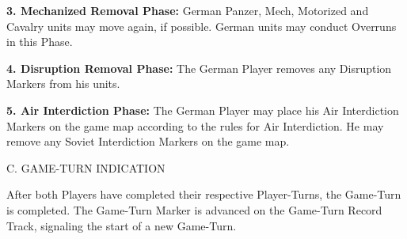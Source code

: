 \textbf{3. Mechanized Removal Phase:} German Panzer, Mech, Motorized and Cavalry units may move again, if possible. German units may conduct Overruns in this Phase.

\textbf{4. Disruption Removal Phase:} The German Player removes any Disruption Markers from his units.

\textbf{5. Air Interdiction Phase:} The German Player may place his Air Interdiction Markers on the game map according to the rules for Air Interdiction. He may remove any Soviet Interdiction Markers on the game map.

C. GAME-TURN INDICATION

After both Players have completed their respective Player-Turns, the Game-Turn is completed. The Game-Turn Marker is advanced on the Game-Turn Record Track, signaling the start of a new Game-Turn.

